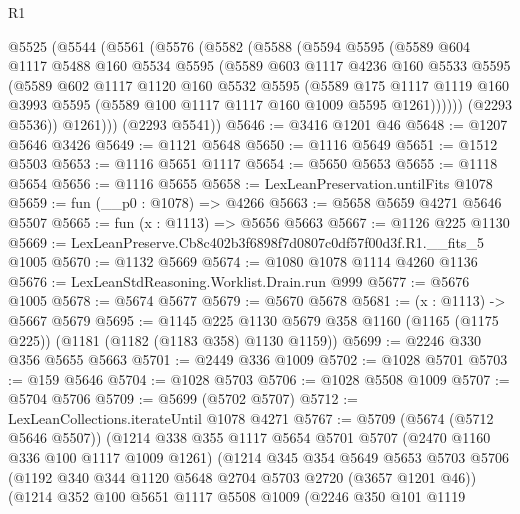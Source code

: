 \begin{lexlean}{R1}
\begin{coremodule}
  @5525
    (@5544
      (@5561
        (@5576
          (@5582
            (@5588
              (@5594
                @5595
                (@5589
                  @604
                  @1117
                  @5488
                  @160
                  @5534
                  @5595
                  (@5589
                    @603
                    @1117
                    @4236
                    @160
                    @5533
                    @5595
                    (@5589
                      @602
                      @1117
                      @1120
                      @160
                      @5532
                      @5595
                      (@5589
                        @175
                        @1117
                        @1119
                        @160
                        @3993
                        @5595
                        (@5589 @100 @1117 @1117 @160 @1009 @5595 @1261))))))
              (@2293 @5536))
            @1261)))
      (@2293 @5541))
@5646 := @3416 @1201 @46
@5648 := @1207 @5646 @3426
@5649 := @1121 @5648
@5650 := @1116 @5649
@5651 := @1512 @5503
@5653 := @1116 @5651 @1117
@5654 := @5650 @5653
@5655 := @1118 @5654
@5656 := @1116 @5655
@5658 := LexLeanPreservation.untilFits @1078
@5659 := fun (__p0 : @1078) => @4266
@5663 := @5658 @5659 @4271 @5646 @5507
@5665 := fun (x : @1113) => @5656 @5663
@5667 := @1126 @225 @1130
@5669 := LexLeanPreserve.Cb8c402b3f6898f7d0807c0df57f00d3f.R1.__fits_5 @1005
@5670 := @1132 @5669
@5674 := @1080 @1078 @1114 @4260 @1136
@5676 := LexLeanStdReasoning.Worklist.Drain.run @999
@5677 := @5676 @1005
@5678 := @5674 @5677
@5679 := @5670 @5678
@5681 := (x : @1113) -> @5667 @5679
@5695 := @1145
    @225
    @1130
    @5679
    @358
    @1160
    (@1165 (@1175 @225))
    (@1181 (@1182 (@1183 @358) @1130 @1159))
@5699 := @2246 @330 @356 @5655 @5663
@5701 := @2449 @336 @1009
@5702 := @1028 @5701
@5703 := @159 @5646
@5704 := @1028 @5703
@5706 := @1028 @5508 @1009
@5707 := @5704 @5706
@5709 := @5699 (@5702 @5707)
@5712 := LexLeanCollections.iterateUntil @1078 @4271
@5767 := @5709
    (@5674 (@5712 @5646 @5507))
    (@1214
      @338
      @355
      @1117
      @5654
      @5701
      @5707
      (@2470 @1160 @336 @100 @1117 @1009 @1261)
      (@1214
        @345
        @354
        @5649
        @5653
        @5703
        @5706
        (@1192 @340 @344 @1120 @5648 @2704 @5703 @2720 (@3657 @1201 @46))
        (@1214
          @352
          @100
          @5651
          @1117
          @5508
          @1009
          (@2246
            @350
            @101
            @1119

\end{coremodule}
\end{lexlean}
